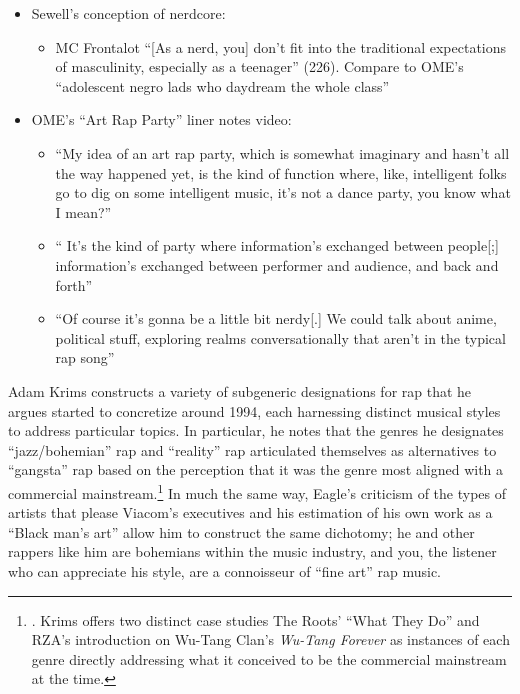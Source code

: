    \begin{itemize}
    \item Sewell's conception of nerdcore:
            \begin{itemize}
                \item MC Frontalot ``[As a nerd, you] don't fit into the traditional expectations of 
                masculinity, especially as a teenager'' (226). Compare to OME's ``adolescent negro lads who 
                daydream the whole class''
            \end{itemize}
        \item OME's ``Art Rap Party'' liner notes video:
            \begin{itemize}
                \item ``My idea of an art rap party, which is somewhat imaginary and hasn't all the way
                happened yet, is the kind of function where, like, intelligent folks go to dig on some
                intelligent music, \textellipsis it's not a dance party, you know what I mean?''
                \item ``  It's the kind of party where information's exchanged between people[;] 
                information's exchanged between performer and audience, and back and forth'' 
                \item ``Of course it's gonna be a little bit nerdy[.] \textellipsis We could talk about 
                anime, \textellipsis political stuff, exploring realms conversationally that aren't in the 
                typical rap song''
            \end{itemize}
    \end{itemize}

Adam Krims constructs a variety of subgeneric designations for rap that he argues started to concretize
around 1994, each harnessing distinct musical styles to address particular topics. In particular, he 
notes that the genres he designates ``jazz/bohemian'' rap and ``reality'' rap articulated themselves 
as alternatives  to ``gangsta'' rap based on the perception that it was the genre most aligned with
a commercial mainstream.\footnote{
    \autocite[64--65]{adamkrimsRapMusicPoetics2000}. Krims offers two distinct case studies\textemdash
    The Roots' ``What They Do'' and RZA's introduction on Wu-Tang Clan's \textit{Wu-Tang Forever}\textemdash 
    as instances of each genre directly addressing what it conceived to be the commercial mainstream 
    at the time.}
In much the same way, Eagle's criticism of the types of artists that please Viacom's executives and his 
estimation of his own work as a ``Black man's art'' allow him to construct the same dichotomy; he and
other rappers like him are bohemians within the music industry, and you, the listener who can appreciate
his style, are a connoisseur of ``fine art'' rap music.

